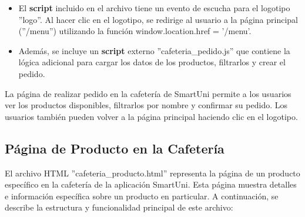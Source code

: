 \documentclass[12pt]{report}
\begin{document}
\begin{itemize}
    \item El \textbf{script}  incluido en el archivo tiene un evento de escucha para el logotipo ''logo''. Al hacer clic en el logotipo, se redirige al usuario a la página principal (''/menu'') utilizando la función window.location.href = '/menu'.

    \item Además, se incluye un \textbf{script} externo ''cafeteria\_pedido.js'' que contiene la lógica adicional para cargar los datos de los productos, filtrarlos y crear el pedido.
\end{itemize}
La página de realizar pedido en la cafetería de SmartUni permite a los usuarios ver los productos disponibles, filtrarlos por nombre y confirmar su pedido. Los usuarios también pueden volver a la página principal haciendo clic en el logotipo.

\subsection{Página de Producto en la Cafetería}
El archivo HTML ''cafeteria\_producto.html'' representa la página de un producto específico en la cafetería de la aplicación SmartUni. Esta página muestra detalles e información específica sobre un producto en particular. A continuación, se describe la estructura y funcionalidad principal de este archivo:
\end{document}
